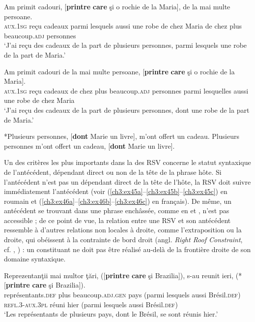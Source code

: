 \ea \label{ch3:ex43} 
\ea 
\gll *Am  primit  cadouri,  [\textbf{printre}  \textbf{care}  şi  o  rochie  de  la  Maria], de  la  mai  multe  persoane. \label{ch3:ex43a}\\
\textsc{aux.1sg}  reçu  cadeaux  parmi  lesquels  aussi  une  robe  de  chez  Maria 
de  chez  plus  beaucoup.\textsc{adj} personnes \\
\glt ‘J’ai reçu des cadeaux de la part de plusieurs personnes, parmi lesquels une robe de la part de Maria.’ 

\ex 
\gll Am  primit  cadouri  de  la  mai  multe  persoane,  [\textbf{printre}  \textbf{care}  şi  o  rochie  de  la  Maria]. \label{ch3:ex43b}\\
\textsc{aux.1sg}  reçu  cadeaux  de  chez  plus  beaucoup.\textsc{adj}  personnes  parmi 
lesquelles  aussi  une  robe  de  chez  Maria \\
\glt ‘J’ai reçu des cadeaux de la part de plusieurs personnes, dont une robe de la part de Maria.’
\z 
\z 


\ea \label{ch3:ex44}
\ea 
*Plusieurs personnes, [\textbf{dont} Marie un livre], m’ont offert un cadeau. \label{ch3:ex44a} 
\ex 
Plusieurs personnes m’ont offert un cadeau, [\textbf{dont} Marie un livre]. \label{ch3:ex44b} 
\z 
\z

Un des critères les plus importants dans la  des RSV concerne le statut syntaxique de l’antécédent, {\cad} dépendant direct ou non de la tête de la phrase hôte. Si l’antécédent n’est pas un dépendant direct de la tête de l’hôte, la RSV doit suivre immédiatement l’antécédent (voir (\ref{ch3:ex45a}--\ref{ch3:ex45b}--\ref{ch3:ex45c}) en roumain et (\ref{ch3:ex46a}--\ref{ch3:ex46b}--\ref{ch3:ex46c}) en français). De même, un antécédent se trouvant dans une phrase enchâssée, comme en  et , n’est pas accessible ; de ce point de vue, la relation entre une RSV et son antécédent ressemble à d’autres relations non locales à droite, comme l’extraposition ou la  droite, qui obéissent à la contrainte de bord droit (angl. \textit{Right Roof Constraint}, cf. \citealt{Ross1967}, \citealt{SoamesEtAl1979}) : un constituant ne doit pas être réalisé au-delà de la frontière droite de son domaine syntaxique. 

\ea \label{ch3:ex45}
\ea
\gll Reprezentanţii  mai  multor  ţări,  ([\textbf{printre} \textbf{care} şi  Brazilia]), s-au  reunit  ieri,  (*[\textbf{printre} \textbf{care} şi  Brazilia]). \label{ch3:ex45a}\\
représentants.\textsc{def}  plus  beaucoup.\textsc{adj.gen}  pays  (parmi  lesquels  aussi  Brésil.\textsc{def}) \textsc{refl.3-aux.3pl}  réuni  hier  (parmi  lesquels  aussi  Brésil.\textsc{def}) \\
\glt ‘Les représentants de plusieurs pays, dont le Brésil, se sont réunis hier.’ 

